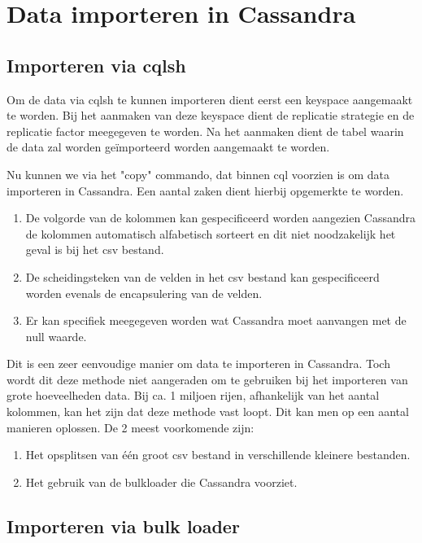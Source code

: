 \chapter{Data importeren in Cassandra}
\label{ch:cassandra_import}

\section{Importeren via cqlsh}
Om de data via cqlsh te kunnen importeren dient eerst een keyspace aangemaakt te worden.
Bij het aanmaken van deze keyspace dient de replicatie strategie en de replicatie factor meegegeven te worden.
Na het aanmaken dient de tabel waarin de data zal worden geïmporteerd worden aangemaakt te worden.

Nu kunnen we via het "copy" commando, dat binnen cql voorzien is om data importeren in Cassandra.
Een aantal zaken dient hierbij opgemerkte te worden.

\begin{enumerate}
	\item De volgorde van de kolommen kan gespecificeerd worden aangezien Cassandra de kolommen automatisch alfabetisch sorteert en dit niet noodzakelijk het geval is bij het csv bestand.
	\item De scheidingsteken van de velden in het csv bestand kan gespecificeerd worden evenals de encapsulering van de velden.
	\item Er kan specifiek meegegeven worden wat Cassandra moet aanvangen met de null waarde.
\end{enumerate}

Dit is een zeer eenvoudige manier om data te importeren in Cassandra.
Toch wordt dit deze methode niet aangeraden om te gebruiken bij het importeren van grote hoeveelheden data.
Bij ca. 1 miljoen rijen, afhankelijk van het aantal kolommen, kan het zijn dat deze methode vast loopt.
Dit kan men op een aantal manieren oplossen.
De 2 meest voorkomende zijn:

\begin{enumerate}
	\item Het opsplitsen van één groot csv bestand in verschillende kleinere bestanden.
	\item Het gebruik van de bulkloader die Cassandra voorziet.
\end{enumerate}

\section{Importeren via bulk loader}